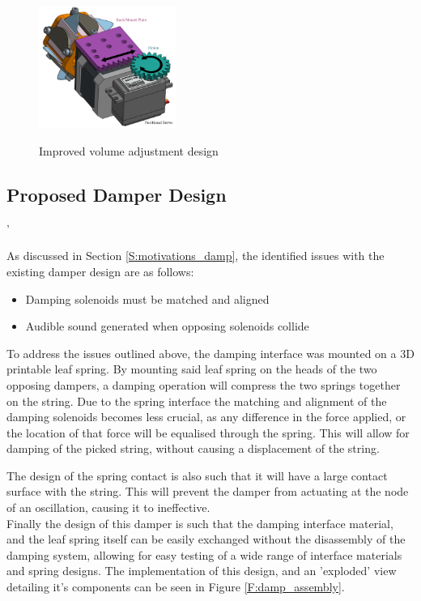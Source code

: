 \documentclass[a4paper,11pt]{article}
\begin{document}
\begin{figure}[h!]
  \begin{center}
    \includegraphics[width=0.4\textwidth]{volume_explode.png}
    \label{F:vol_assembly}
    \caption{Improved volume adjustment design}
  \end{center}
\end{figure}


\subsection{Proposed Damper Design}'

As discussed in Section \ref{S:motivations_damp}, the identified issues with the existing damper design are as follows:

\begin{itemize}
  \item Damping solenoids must be matched and aligned
  \item Audible sound generated when opposing solenoids collide
\end{itemize}

To address the issues outlined above, the damping interface was mounted on a 3D printable leaf spring. By mounting said leaf spring on the heads of the two opposing dampers, a damping operation will compress the two springs together on the string. Due to the spring interface the matching and alignment of the damping solenoids becomes less crucial, as any difference in the force applied, or the location of that force will be equalised through the spring. This will allow for damping of the picked string, without causing a displacement of the string.

The design of the spring contact is also such that it will have a large contact surface with the string. This will prevent the damper from actuating at the node of an oscillation, causing it to ineffective.\\

Finally the design of this damper is such that the damping interface material, and the leaf spring itself can be easily exchanged without the disassembly of the damping system, allowing for easy testing of a wide range of interface materials and spring designs. The implementation of this design, and an 'exploded' view detailing it's components can be seen in Figure \ref{F:damp_assembly}.
\end{document}
